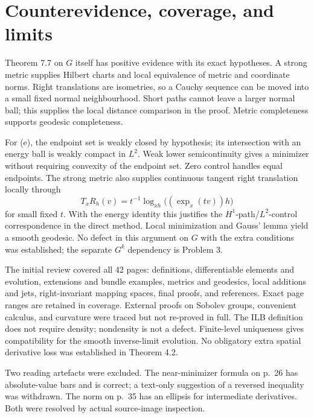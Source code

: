 \documentclass[10pt]{article}
\begin{document}
\section*{Counterevidence, coverage, and limits}
Theorem 7.7 on \(G\) itself has positive evidence with its exact hypotheses. A strong metric supplies Hilbert charts and local equivalence of metric and coordinate norms. Right translations are isometries, so a Cauchy sequence can be moved into a small fixed normal neighbourhood. Short paths cannot leave a larger normal ball; this supplies the local distance comparison in the proof. Metric completeness supports geodesic completeness.\par
For (e), the endpoint set is weakly closed by hypothesis; its intersection with an energy ball is weakly compact in \(L^2\). Weak lower semicontinuity gives a minimizer without requiring convexity of the endpoint set. Zero control handles equal endpoints. The strong metric also supplies continuous tangent right translation locally through \[T_xR_h(v)=t^{-1}\log_{xh}\bigl((\exp_x(tv))h\bigr)\] for small fixed \(t\). With the energy identity this justifies the \(H^1\)-path/\(L^2\)-control correspondence in the direct method. Local minimization and Gauss’ lemma yield a smooth geodesic. No defect in this argument on \(G\) with the extra conditions was established; the separate \(G^k\) dependency is Problem 3.\par
The initial review covered all 42 pages: definitions, differentiable elements and evolution, extensions and bundle examples, metrics and geodesics, local additions and jets, right-invariant mapping spaces, final proofs, and references. Exact page ranges are retained in coverage. External proofs on Sobolev groups, convenient calculus, and curvature were traced but not re-proved in full. The ILB definition does not require density; nondensity is not a defect. Finite-level uniqueness gives compatibility for the smooth inverse-limit evolution. No obligatory extra spatial derivative loss was established in Theorem 4.2.\par
Two reading artefacts were excluded. The near-minimizer formula on p. 26 has absolute-value bars and is correct; a text-only suggestion of a reversed inequality was withdrawn. The norm on p. 35 has an ellipsis for intermediate derivatives. Both were resolved by actual source-image inspection.\par
\end{document}
